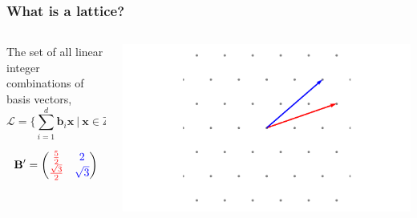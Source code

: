 \documentclass[
aspectratio=169, %
t, %
onlytextwidth, %
10pt, %
]{beamer}
\begin{document}
\begin{frame}
    \frametitle{What is a lattice?}
    \begin{columns}[T]
        \begin{column}{0.48\linewidth}
            \begin{center}
            \begin{tcolorbox}[colback=ICLBlue!5!white,colframe=ICLBlue,title=\textbf{Definition:} Lattice]
                The set of all linear integer combinations of basis vectors,
                \[
                    \mathcal{L} = \{ \sum_{i = 1}^{d}\mathbf{b}_i\mathbf{x} \ | \ \mathbf{x} \in \mathbb{Z}^d \}
                \]
            \end{tcolorbox}

            \[
                \mathbf{B'} = \begin{pmatrix}
                    \color{red}\frac{5}{2} & \color{blue}2\\
                    \color{red}\frac{\sqrt{3}}{2} & \color{blue}\sqrt{3}
                \end{pmatrix}
            \]
            \end{center}
        \end{column}
        \begin{column}{0.48\linewidth}
            \includegraphics[width=\linewidth]{a2_bad_basis.png}
        \end{column}
    \end{columns}
\end{frame}


\end{document}
